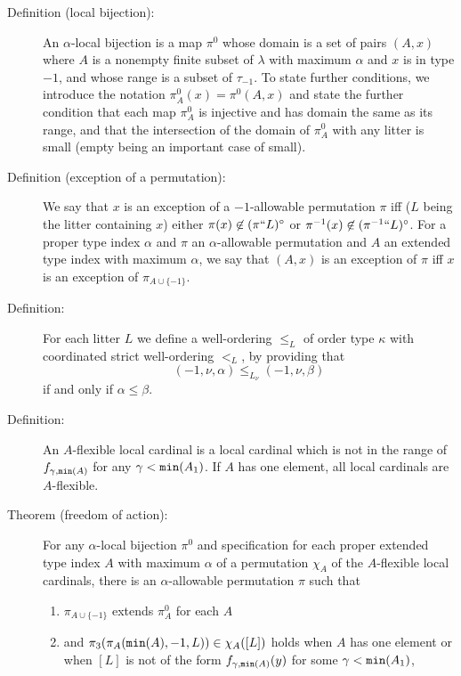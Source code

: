 \documentclass[112pt]{article}
\begin{document}
\begin{description}

\item[Definition (local bijection):]  An $\alpha$-local bijection is a map $\pi^0$ whose domain is a set of pairs $(A,x)$ where $A$ is a nonempty finite subset of $\lambda$ with maximum $\alpha$ and $x$ is in type $-1$,  and whose range is a subset of $\tau_{-1}$.  To state further conditions, we introduce the notation $\pi^0_A(x) = \pi^0(A,x)$ and state the further condition that each map $\pi^0_A$ is injective and has domain the same as its range, and that the intersection of the domain of $\pi^0_A$ with any litter is small (empty being an important case of small).

\item[Definition (exception of a permutation):]  We say that $x$ is an exception of a $-1$-allowable permutation $\pi$ iff ($L$ being the litter containing $x$) either $\pi(x) \not\in (\pi``L)^\circ$ or $\pi^{-1}(x) \not\in (\pi^{-1}``L)^\circ$.  For a proper type index $\alpha$ and $\pi$ an $\alpha$-allowable permutation and $A$ an extended type index with maximum $\alpha$, we say that $(A,x)$ is an exception of $\pi$ iff
$x$ is an exception of $\pi_{A \cup \{-1\}}$.

\item[Definition:]  For each litter $L$ we define a well-ordering $\leq_L$ of order type $\kappa$ with coordinated strict well-ordering $<_L$, by providing that $$(-1,\nu,\alpha)\leq_{L_\nu} (-1,\nu,\beta)$$ if and only if $\alpha\leq \beta$.

\item[Definition:]  An $A$-flexible local cardinal is a local cardinal
which is not in the range of $f_{\gamma,{\tt min}(A)}$ for any $\gamma<{\tt min}(A_1)$.  If $A$ has one element, all local cardinals are $A$-flexible.

\item[Theorem (freedom of action):]  For any $\alpha$-local bijection $\pi^0$ 
and specification for each proper extended type index $A$ with maximum $\alpha$ of a permutation $\chi_A$ of the $A$-flexible local cardinals,
there is an $\alpha$-allowable permutation $\pi$ such that

\begin{enumerate}

\item $\pi_{A\cup \{-1\}}$ extends $\pi^0_A$ for each $A$ 

\item and $\pi_3(\pi_A({\tt min}(A),-1,L))\in \chi_A([L])$ holds when $A$ has one element or when $[L]$ is  not of the form $f_{\gamma,{\tt min}(A)}(y)$ for some $\gamma<{\tt min}(A_1)$, 


\end{enumerate}
\end{description}
\end{document}
